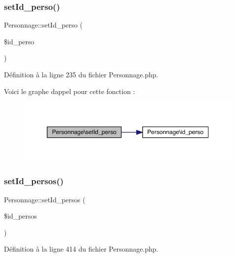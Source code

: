 \subsubsection{\texorpdfstring{set\+Id\+\_\+perso()}{setId\_perso()}}
{\footnotesize\ttfamily Personnage\+::set\+Id\+\_\+perso (\begin{DoxyParamCaption}\item[{}]{\$id\+\_\+perso }\end{DoxyParamCaption})}



Définition à la ligne 235 du fichier Personnage.\+php.

Voici le graphe d\textquotesingle{}appel pour cette fonction \+:\nopagebreak
\begin{figure}[H]
\begin{center}
\leavevmode
\includegraphics[width=350pt]{class_personnage_abcc3bdc5236dbfccd50c3dc5db1e8fce_cgraph}
\end{center}
\end{figure}
\mbox{\label{class_personnage_ac11963514b5d9911283b7ff61e094125}} 
\subsubsection{\texorpdfstring{set\+Id\+\_\+persos()}{setId\_persos()}}
{\footnotesize\ttfamily Personnage\+::set\+Id\+\_\+persos (\begin{DoxyParamCaption}\item[{}]{\$id\+\_\+persos }\end{DoxyParamCaption})}



Définition à la ligne 414 du fichier Personnage.\+php.


